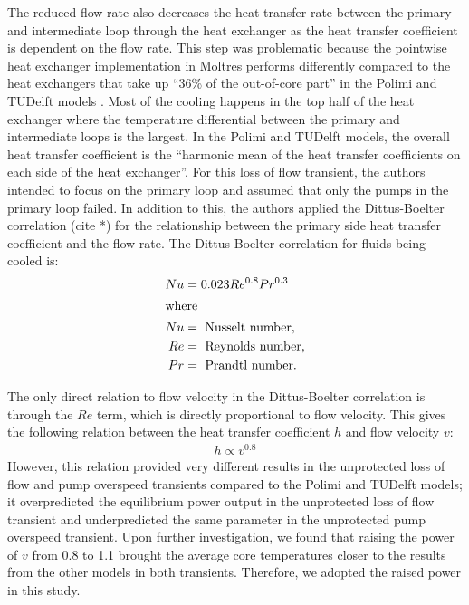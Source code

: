 The reduced flow rate also decreases the heat transfer rate between the
primary and intermediate loop through the heat exchanger as the heat transfer
coefficient is dependent on the flow rate. This step was problematic because
the pointwise heat exchanger implementation in Moltres performs differently
compared to the heat exchangers that take up ``36\% of the out-of-core part''
in the Polimi and TUDelft models \cite{fiorina_modelling_2014}. Most of the
cooling happens in the top half of the heat exchanger where the temperature
differential between the primary and intermediate loops is the largest. In the
Polimi and TUDelft models, the overall heat transfer coefficient is the
``harmonic mean of the heat transfer coefficients on each side of the heat
exchanger''. For this loss of flow transient, the authors intended to focus on
the primary loop and assumed that only the pumps in the primary loop failed.
In addition to this, the authors applied the Dittus-Boelter correlation (cite
*) for
the relationship between the primary side heat transfer coefficient and the
flow rate. The Dittus-Boelter correlation for fluids being cooled is:
%
\begin{align}
    Nu &= 0.023 Re^{0.8} Pr^{0.3} \label{eq:db} \\
    \intertext{where}
    Nu &= \text{ Nusselt number,} \nonumber \\
    Re &= \text{ Reynolds number,} \nonumber \\
    Pr &= \text{ Prandtl number.} \nonumber
\end{align}

The only direct relation to flow velocity in the Dittus-Boelter correlation is
through the $Re$ term, which is directly proportional to flow velocity. This
gives the following relation between the heat transfer coefficient $h$ and
flow velocity $v$:
%
\begin{align}
    h \propto v^{0.8} \label{eq:hv}
\end{align}
%
However, this relation provided very different results in the unprotected loss
of flow and pump overspeed transients compared to the Polimi and TUDelft
models; it overpredicted the equilibrium power output in the
unprotected loss of flow transient and underpredicted the same parameter in
the unprotected pump overspeed transient. Upon further investigation, we found
that raising the power of $v$ from 0.8 to 1.1 brought the average core
temperatures closer to the results from the other models in both transients.
Therefore, we adopted the raised power in this study.

